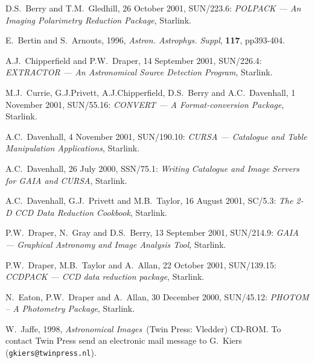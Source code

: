 \documentclass[twoside,11pt]{article}
\newenvironment{latexonly}{}{}
\newcommand{\xref}[3]{#1}
\begin{document}
% 
\newpage
{}
\begin{thebibliography}{99}

   D.S.~Berry and T.M.~Gledhill, 26 October 2001,
   \xref{SUN/223.6}{sun223}{}: {\it POLPACK --- An Imaging Polarimetry
   Reduction Package}, Starlink.

   E.~Bertin and S.~Arnouts, 1996, {\it Astron.
   Astrophys. Suppl}, {\bf 117}, pp393-404.

   A.J.~Chipperfield and P.W.~Draper, 14 September 2001,
   \xref{SUN/226.4}{sun226}{}: {\it EXTRACTOR --- An Astronomical Source
   Detection Program}, Starlink.

   M.J.~Currie, G.J.Privett, A.J.Chipperfield,
   D.S.~Berry and A.C.~Davenhall, 1 November 2001,
   \xref{SUN/55.16}{sun55}{}: {\it CONVERT --- A Format-conversion
   Package}, Starlink.

   A.C.~Davenhall, 4 November 2001,
   \xref{SUN/190.10}{sun190}{}: {\it CURSA --- Catalogue and Table
   Manipulation Applications}, Starlink.

   A.C.~Davenhall, 26 July 2000,
   \xref{SSN/75.1}{ssn75}{}: {\it Writing Catalogue and Image Servers for
   GAIA and CURSA}, Starlink.

   A.C.~Davenhall, G.J.~Privett and M.B.~Taylor, 16 August 2001,
   \xref{SC/5.3}{sc5}{}: {\it The 2-D CCD Data Reduction Cookbook},
   Starlink.

   P.W.~Draper, N.~Gray and D.S.~Berry, 13 September 2001,
   \xref{SUN/214.9}{sun214}{}: {\it GAIA --- Graphical Astronomy and
   Image Analysis Tool}, Starlink.

   P.W.~Draper, M.B.~Taylor and A.~Allan, 22 October 2001,
   \xref{SUN/139.15}{sun139}{}: {\it CCDPACK --- CCD data reduction
   package}, Starlink.

   N.~Eaton, P.W.~Draper and A.~Allan, 30 December 2000,
   \xref{SUN/45.12}{sun45}{}: {\it PHOTOM -- A Photometry Package},
   Starlink.

   W.~Jaffe, 1998, {\it Astronomical Images}\,
   (Twin Press: Vledder) CD-ROM.  To contact Twin Press send an electronic
   mail message to G.~Kiers ({\tt gkiers@twinpress.nl}).


\end{thebibliography}
\end{document}
